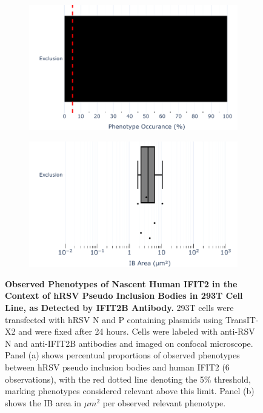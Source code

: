 \begin{figure}
    \begin{subfigure}{0.495\textwidth}
        \caption{}
        \includegraphics[width=1\linewidth]{08. Chapter 3/Figs/03. pIB/03. IFIT2/03. IFIT2B/01. bar_i2b_293t.pdf} 
    \end{subfigure}
    \begin{subfigure}{0.495\textwidth}
        \caption{}
        \includegraphics[width=1\linewidth]{08. Chapter 3/Figs/03. pIB/03. IFIT2/03. IFIT2B/02. box_i2b_293t.pdf}
    \end{subfigure}
    \caption[Observed Phenotypes of Nascent Human IFIT2 in the Context of hRSV Pseudo Inclusion Bodies in 293T Cell Line, as Detected by IFIT2B Antibody.]{\textbf{Observed Phenotypes of Nascent Human IFIT2 in the Context of hRSV Pseudo Inclusion Bodies in 293T Cell Line, as Detected by IFIT2B Antibody.} 293T cells were transfected with hRSV N and P containing plasmids using TransIT-X2 and were fixed after 24 hours. Cells were labeled with anti-RSV N and anti-IFIT2B antibodies and imaged on confocal microscope. Panel (a) shows percentual proportions of observed phenotypes between hRSV pseudo inclusion bodies and human IFIT2 (6 observations), with the red dotted line denoting the 5\% threshold, marking phenotypes considered relevant above this limit. Panel (b) shows the IB area in \(\mu m^2\) per observed relevant phenotype.}
    \label{fig:Observed Phenotypes of Nascent Human IFIT2 in the Context of hRSV Pseudo Inclusion Bodies in 293T Cell Line, as Detected by IFIT2B Antibody}
\end{figure}

